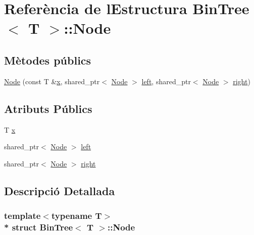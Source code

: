 \hypertarget{struct_bin_tree_1_1_node}{}\section{Referència de l\textquotesingle{}Estructura Bin\+Tree$<$ T $>$\+:\+:Node}
\label{struct_bin_tree_1_1_node}
\subsection*{Mètodes públics}
\begin{DoxyCompactItemize}
\item 
\hyperlink{struct_bin_tree_1_1_node_af45885e303875c018e89fa5c8b96bde0}{Node} (const T \&\hyperlink{struct_bin_tree_1_1_node_a9c268d4af01559e8237dbeb5bd19af91}{x}, shared\+\_\+ptr$<$ \hyperlink{struct_bin_tree_1_1_node}{Node} $>$ \hyperlink{struct_bin_tree_1_1_node_a265a6367635a38838e6a6366564be78d}{left}, shared\+\_\+ptr$<$ \hyperlink{struct_bin_tree_1_1_node}{Node} $>$ \hyperlink{struct_bin_tree_1_1_node_a6df770137090da60cd0376ce06893cbd}{right})
\end{DoxyCompactItemize}
\subsection*{Atributs Públics}
\begin{DoxyCompactItemize}
\item 
T \hyperlink{struct_bin_tree_1_1_node_a9c268d4af01559e8237dbeb5bd19af91}{x}
\item 
shared\+\_\+ptr$<$ \hyperlink{struct_bin_tree_1_1_node}{Node} $>$ \hyperlink{struct_bin_tree_1_1_node_a265a6367635a38838e6a6366564be78d}{left}
\item 
shared\+\_\+ptr$<$ \hyperlink{struct_bin_tree_1_1_node}{Node} $>$ \hyperlink{struct_bin_tree_1_1_node_a6df770137090da60cd0376ce06893cbd}{right}
\end{DoxyCompactItemize}


\subsection{Descripció Detallada}
\subsubsection*{template$<$typename T$>$\\*
struct Bin\+Tree$<$ T $>$\+::\+Node}



